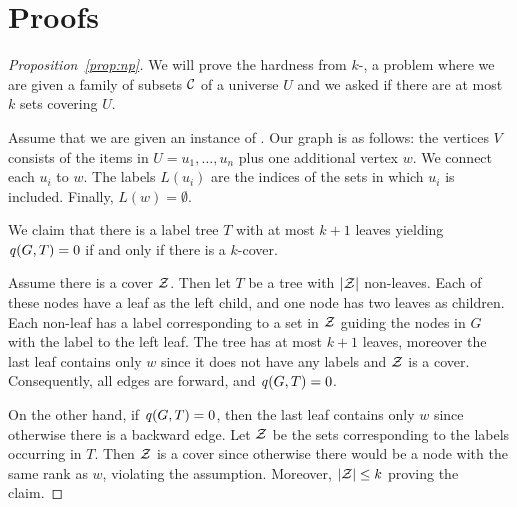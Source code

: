\section{Proofs}


\begin{proof}[Proposition~\ref{prop:np}]
We will prove the hardness from $k$-\prbcover, a problem where we are given a
family of subsets ${\mathcal{C}}$ of a universe $U$ and we asked if there are at most $k$
sets covering $U$.

Assume that we are given an instance of \prbcover. Our graph is as follows: the
vertices $V$ consists of the items in $U = u_1, \ldots, u_n$ plus one additional
vertex $w$.  We connect each $u_i$ to $w$. The labels $L(u_i)$ are the indices
of the sets in which $u_i$ is included. Finally, $L(w) = \emptyset$.

We claim that there is a label tree $T$ with at most $k + 1$ leaves yielding
$\labelscore{G, T} = 0$ if and only if there is a $k$-cover.

Assume there is a cover ${\mathcal{Z}}$. Then let $T$ be a tree with ${\left|{\mathcal{Z}}\right|}$ non-leaves.
Each of these nodes have a leaf as the left child, and one node has two leaves
as children. Each non-leaf has a label corresponding to a set in ${\mathcal{Z}}$
guiding the nodes in $G$ with the label to the left leaf.
The tree has at most $k + 1$ leaves, moreover the last leaf contains only
$w$ since it does not have any labels and ${\mathcal{Z}}$ is a cover. Consequently, all 
edges are forward, and $\labelscore{G, T} = 0$.

On the other hand, if $\labelscore{G, T} = 0$, then the last leaf contains only $w$
since otherwise there is a backward edge. Let ${\mathcal{Z}}$ be the sets corresponding
to the labels occurring in $T$. Then ${\mathcal{Z}}$ is a cover since otherwise there would
be a node with the same rank as $w$, violating the assumption. Moreover, ${\left|{\mathcal{Z}}\right|} \leq k$
proving the claim.
\end{proof}

